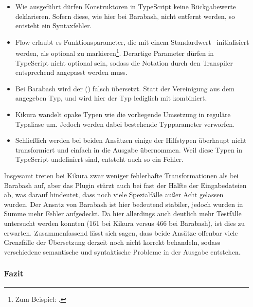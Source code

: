\begin{itemize}
  \item Wie ausgeführt dürfen Konstruktoren in TypeScript keine Rückgabewerte deklarieren. Sofern diese, wie hier bei Barabash, nicht entfernt werden, so entsteht ein Syntaxfehler.
  \item Flow erlaubt es Funktionsparameter, die mit einem Standardwert~\autocite{MDN:DEFAULT_PARAMS} initialisiert werden, als optional zu markieren\footnote{Zum Beispiel: .}. Derartige Parameter dürfen in TypeScript nicht optional sein, sodass die Notation durch den Transpiler entsprechend angepasst werden muss.
  \item Bei Barabash wird der  () falsch übersetzt. Statt der Vereinigung aus dem angegeben Typ,  und  wird hier der Typ lediglich mit  kombiniert.
  \item Kikura wandelt opake Typen wie die vorliegende Umsetzung in reguläre Typaliase um. Jedoch werden dabei bestehende Typparameter verworfen.
  \item Schließlich werden bei beiden Ansätzen einige der Hilfstypen überhaupt nicht transformiert und einfach in die Ausgabe übernommen. Weil diese Typen in TypeScript undefiniert sind, entsteht auch so ein Fehler.
\end{itemize}

Insgesamt treten bei Kikura zwar weniger fehlerhafte Transformationen als bei Barabash auf, aber das Plugin stürzt auch bei fast der Hälfte der Eingabedateien ab, was darauf hindeutet, dass noch viele Spezialfälle außer Acht gelassen wurden. Der Ansatz von Barabash ist hier bedeutend stabiler, jedoch wurden in Summe mehr Fehler aufgedeckt. Da hier allerdings auch deutlich mehr Testfälle untersucht werden konnten (161 bei Kikura versus 466 bei Barabash), ist dies zu erwarten. Zusammenfassend lässt sich sagen, dass beide Ansätze offenbar viele Grenzfälle der Übersetzung derzeit noch nicht korrekt behandeln, sodass verschiedene semantische und syntaktische Probleme in der Ausgabe entstehen.

\subsubsection{Fazit}

